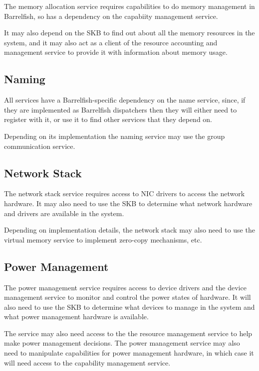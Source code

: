 \documentclass[a4paper,twoside]{report} %
\begin{document}
The memory allocation service requires capabilities to do memory
management in Barrelfish, so has a dependency on the capabiity
management service.

It may also depend on the SKB to find out about all the memory
resources in the system, and it may also act as a client of the
resource accounting and management service to provide it with
information about memory usage.

\subsection{Naming}

All services have a Barrelfish-specific dependency on the name
service, since, if they are implemented as Barrelfish dispatchers
then they will either need to register with it, or use it to find
other services that they depend on.

Depending on its implementation the naming service may use the group
communication service.

\subsection{Network Stack}

The network stack service requires access to NIC drivers to access the
network hardware.  It may also need to use the SKB to determine what
network hardware and drivers are available in the system.  

Depending on implementation details, the network stack may also need
to use the virtual memory service to implement zero-copy mechanisms, etc.

\subsection{Power Management}

The power management service requires access to device drivers and the
device management service to monitor and control the power states of hardware.
It will also need to use the SKB to determine what devices to manage
in the system and what power management hardware is available.

The service may also need access to the the resource management service
to help make power management decisions. The power management service
may also need to manipulate capabilities for power management
hardware, in which case it will need access to the capability
management service.
\end{document}
